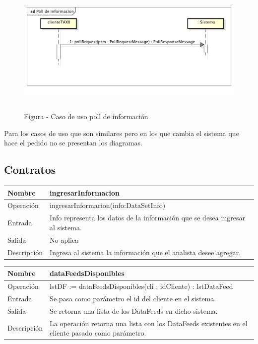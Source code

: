 \documentclass[11pt]{article}
\newcounter{Figura}
\renewcommand\theFigura{\arabic{Figura}}
\begin{document}
\begin{figure}[h!]
    \centering
        \includegraphics[width=5.7638in,height=2.5055in]{Analisisdelproblema-img/Analisisdelproblema-img010.png}
        Figura \stepcounter{Figura}{\theFigura} - Caso de uso poll de información
\end{figure}
\newpage
Para los casos de uso que son similares pero en los que cambia el sistema que hace el pedido no se presentan los diagramas.
\newpage
\subsection[Contratos]{Contratos}
\bigskip

\begin{flushleft}
\tablefirsthead{}
\tablehead{}
\tabletail{}
\tablelasttail{}
\begin{supertabular}{|m{1.0115598in}|m{4.7441597in}|}
\hline
Nombre &
ingresarInformacion\\\hline
Operación &
ingresarInformacion(info:DataSetInfo)\\\hline
Entrada &
Info representa los datos de la información que se desea ingresar al sistema.\\\hline
Salida &
No aplica\\\hline
Descripción &
Ingresa al sistema la información que el analista desee agregar.\\\hline
\end{supertabular}
\end{flushleft}

\bigskip

\begin{flushleft}
\tablefirsthead{}
\tablehead{}
\tabletail{}
\tablelasttail{}
\begin{supertabular}{|m{1.0115598in}|m{4.7441597in}|}
\hline
Nombre &
dataFeedsDisponibles\\\hline
Operación &
lstDF := dataFeedsDisponibles(cli : idCliente) : lstDataFeed\\\hline
Entrada &
Se pasa como parámetro el id del cliente en el sistema.\\\hline
Salida &
Se retorna una lista de los DataFeeds en dicho sistema.\\\hline
Descripción &
La operación retorna una lista con los DataFeeds existentes en el cliente pasado como parámetro.\\\hline
\end{supertabular}
\end{flushleft}
\end{document}
